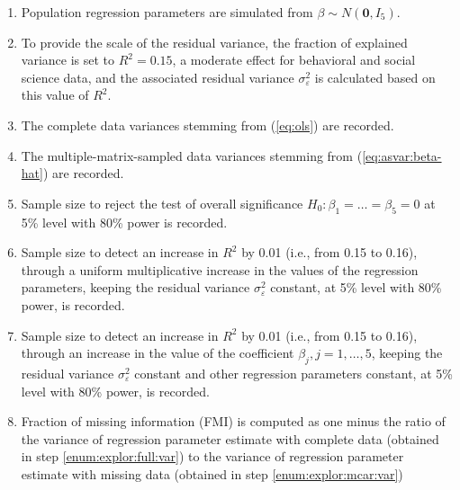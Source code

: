 \documentclass[11pt]{asaproc}
\begin{document}
\begin{enumerate}
    \item Population regression parameters are simulated from $\beta \sim N(\mathbf{0},I_5)$.
    \item To provide the scale of the residual variance, the fraction of explained variance is set to
        $R^2=0.15$, a moderate effect for behavioral and social science data, and the associated
        residual variance $\sigma_\varepsilon^2$ is calculated based on this value of $R^2$.
    \item The complete data variances stemming from (\ref{eq:ols}) are recorded.
        \label{enum:explor:full:var}
    \item The multiple-matrix-sampled data variances stemming from (\ref{eq:asvar:beta-hat}) are recorded.
        \label{enum:explor:mcar:var}
    \item Sample size to reject the test of overall significance $H_0: \beta_1 = \ldots = \beta_5 = 0$
        at 5\% level with 80\% power is recorded.
        \label{enum:explor:n:overall}
    \item Sample size to detect an increase in $R^2$ by 0.01 (i.e., from 0.15 to 0.16), through a uniform
        multiplicative increase in the values of the regression parameters, keeping the residual variance
        $\sigma_\varepsilon^2$ constant, at 5\% level with 80\% power, is recorded.
        \label{enum:explor:n:infl}
    \item Sample size to detect an increase in $R^2$ by 0.01 (i.e., from 0.15 to 0.16), through an increase
        in the value of the coefficient $\beta_j, j=1, \ldots, 5$, keeping the residual variance
        $\sigma_\varepsilon^2$ constant and other regression parameters constant, at 5\% level with 80\% power, is recorded.
        \label{enum:explor:n:poke}
    \item Fraction of missing information (FMI) is computed as one minus the ratio
        of the variance of regression parameter estimate with complete data (obtained in step \ref{enum:explor:full:var})
        to the variance of regression parameter estimate with missing data (obtained in step \ref{enum:explor:mcar:var})
        \label{enum:explor:fmi}
\end{enumerate}
\end{document}

